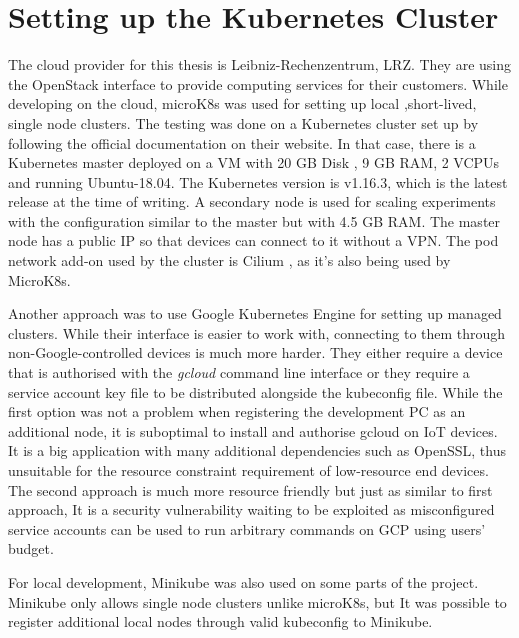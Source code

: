 \section{Setting up the Kubernetes Cluster}
The cloud provider for this thesis is Leibniz-Rechenzentrum, LRZ. They are using the OpenStack \cite{openstack} interface to provide computing services for their customers. While developing on the cloud, microK8s was used for setting up local ,short-lived, single node clusters. The testing was done on a Kubernetes cluster set up by following the official documentation on their website. In that case, there is a Kubernetes master deployed on a VM with 20 GB Disk , 9 GB RAM, 2 VCPUs and running Ubuntu-18.04. The Kubernetes version is v1.16.3, which is the latest release at the time of writing. A secondary node is used for scaling experiments with the configuration similar to the master but with 4.5 GB RAM. The master node has a public IP so that devices can connect to it without a VPN. The pod network add-on used by the cluster is Cilium \cite{cilium}, as it's also being used by MicroK8s.

Another approach was to use Google Kubernetes Engine for setting up managed clusters. While their interface is easier to work with, connecting to them through non-Google-controlled devices is much more harder. They either require a device that is authorised with the \textit{gcloud} command line interface or they require a service account key file to be distributed alongside the kubeconfig file. While the first option was not a problem when registering the development PC as an additional node, it is suboptimal to install and authorise gcloud on IoT devices. It is a big application with many additional dependencies such as OpenSSL, thus unsuitable for the resource constraint requirement of low-resource end devices. The second approach is much more resource friendly but just as similar to first approach, It is a security vulnerability waiting to be exploited as misconfigured service accounts can be used to run arbitrary commands on GCP using users' budget.

For local development, Minikube was also used on some parts of the project. Minikube only allows single node clusters unlike microK8s, but It was possible to register additional local nodes through valid kubeconfig to Minikube.
